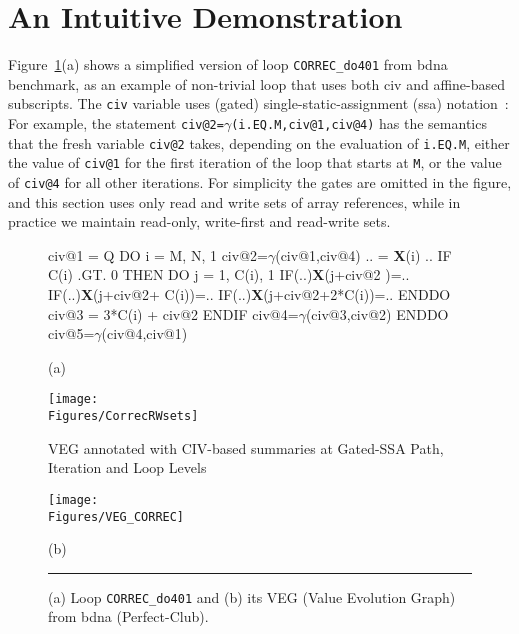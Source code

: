 \documentclass{sig-alternate}
\newcommand{\mymath}[1]{$ #1 $}
\newcommand{\Figures}[1]{../Figures/}
\begin{document}
\section{An Intuitive Demonstration}
\label{Intro:RelAppLim}

\enlargethispage{\baselineskip}

Figure~\ref{fig:codeActforCorrec}(a) shows a simplified version of
loop {\tt CORREC\_do401} from {\sc bdna} benchmark, %
as an example of non-trivial loop that uses both {\sc civ} and affine-based
subscripts.   The {\tt civ} variable uses (gated) 
single-static-assignment ({\sc ssa}) notation~\cite{GatedSSA}:
%
For example, the statement {\tt civ@2=$\gamma$(i.EQ.M,civ@1,civ@4)}
has the semantics that the fresh variable {\tt civ@2} takes, depending 
on the evaluation of {\tt i.EQ.M}, either the value of {\tt civ@1} for 
the first iteration of the loop that starts at {\tt M}, or the value of 
{\tt civ@4} for all other iterations. For simplicity the gates are
omitted in the figure, and this section uses only read and write sets 
of array references, while in practice we maintain read-only, 
write-first and read-write sets. 

\begin{figure}
\begin{minipage}{0.48\columnwidth}
\begin{colorcode}
civ@1 = Q
DO i = M, N, 1
 civ@2=\mymath{\gamma}(civ@1,civ@4)
 .. = {\bf X}(i) ..
 IF C(i) .GT. 0 THEN
  DO j = 1, C(i), 1
   IF(..){\bf{}X}(j+civ@2       )=..
   IF(..){\bf{}X}(j+civ@2+  C(i))=..
   IF(..){\bf{}X}(j+civ@2+2*C(i))=..
  ENDDO
  civ@3 = 3*C(i) + civ@2
 ENDIF
 civ@4=\mymath{\gamma}(civ@3,civ@2)
ENDDO
civ@5=\mymath{\gamma}(civ@4,civ@1)  

            (a)
\end{colorcode}
\hspace{2ex}\texttt{[image: \\Figures/CorrecRWsets]}
\end{minipage}
\begin{minipage}{0.45\columnwidth}
\begin{colorcode}
 VEG annotated with CIV-based 
 summaries at Gated-SSA Path, 
  Iteration and Loop Levels
\end{colorcode}
\texttt{[image: \\Figures/VEG\_CORREC]}\vspace{-2ex}
\begin{colorcode}
                (b)
\end{colorcode}
\end{minipage}
\hrule
\caption{(a) Loop {\tt CORREC\_do401} and (b) its VEG (Value Evolution Graph) 
                from {\sc bdna} ({\sc Perfect-Club}).}
\label{fig:codeActforCorrec}
\end{figure}
\end{document}
